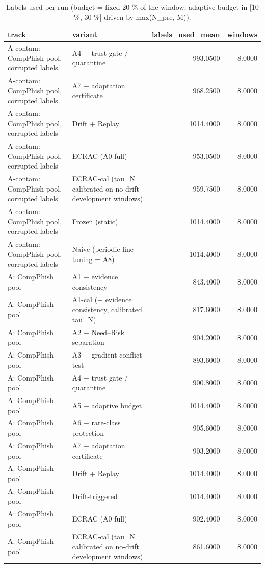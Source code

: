 \begin{table}[t]
\centering
\scriptsize
\caption{Labels used per run (budget = fixed 20 \% of the window; adaptive budget in [10 \%, 30 \%] driven by max(N\_pre, M)).}
\label{tab:rev_R12_ecrac_label_budgets}
\begin{tabular}{llrr}
\toprule
track & variant & labels\_used\_mean & windows \\
\midrule
A-contam: CompPhish pool, corrupted labels & A4 − trust gate / quarantine & 993.0500 & 8.0000 \\
A-contam: CompPhish pool, corrupted labels & A7 − adaptation certificate & 968.2500 & 8.0000 \\
A-contam: CompPhish pool, corrupted labels & Drift + Replay & 1014.4000 & 8.0000 \\
A-contam: CompPhish pool, corrupted labels & ECRAC (A0 full) & 953.0500 & 8.0000 \\
A-contam: CompPhish pool, corrupted labels & ECRAC-cal (tau\_N calibrated on no-drift development windows) & 959.7500 & 8.0000 \\
A-contam: CompPhish pool, corrupted labels & Frozen (static) & 1014.4000 & 8.0000 \\
A-contam: CompPhish pool, corrupted labels & Naive (periodic fine-tuning = A8) & 1014.4000 & 8.0000 \\
A: CompPhish pool & A1 − evidence consistency & 843.4000 & 8.0000 \\
A: CompPhish pool & A1-cal (− evidence consistency, calibrated tau\_N) & 817.6000 & 8.0000 \\
A: CompPhish pool & A2 − Need–Risk separation & 904.2000 & 8.0000 \\
A: CompPhish pool & A3 − gradient-conflict test & 893.6000 & 8.0000 \\
A: CompPhish pool & A4 − trust gate / quarantine & 900.8000 & 8.0000 \\
A: CompPhish pool & A5 − adaptive budget & 1014.4000 & 8.0000 \\
A: CompPhish pool & A6 − rare-class protection & 905.6000 & 8.0000 \\
A: CompPhish pool & A7 − adaptation certificate & 903.2000 & 8.0000 \\
A: CompPhish pool & Drift + Replay & 1014.4000 & 8.0000 \\
A: CompPhish pool & Drift-triggered & 1014.4000 & 8.0000 \\
A: CompPhish pool & ECRAC (A0 full) & 902.4000 & 8.0000 \\
A: CompPhish pool & ECRAC-cal (tau\_N calibrated on no-drift development windows) & 861.6000 & 8.0000 \\

\end{tabular}
\end{table}
